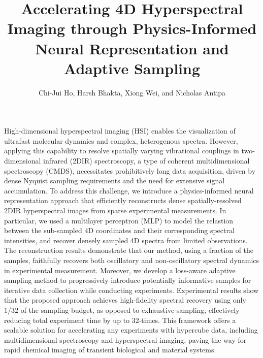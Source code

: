 \documentclass{optica-article}
\begin{document}
\title{Accelerating 4D Hyperspectral Imaging through Physics-Informed Neural Representation and Adaptive Sampling}

\author{
Chi-Jui Ho,
Harsh Bhakta,
Xiong Wei,
and Nicholas Antipa
}

\address{
Dept. of Electrical and Computer Engineering, UC San Diego, La Jolla, CA 92093, USA\\
Dept. of Chemistry and Biochemistry, UC San Diego, La Jolla, CA 92093, USA
}



\begin{abstract*} 
High-dimensional hyperspectral imaging (HSI) enables the visualization of ultrafast molecular dynamics and complex, heterogenous spectra. However, applying this capability to resolve spatially varying vibrational couplings in two-dimensional infrared (2DIR) spectroscopy, a type of coherent multidimensional spectroscopy (CMDS), necessitates prohibitively long data acquisition, driven by dense Nyquist sampling requirements and the need for extensive signal accumulation. To address this challenge, we introduce a physics-informed neural representation approach that efficiently reconstructs dense spatially-resolved 2DIR hyperspectral images from sparse experimental measurements. In particular, we used a multilayer perceptron (MLP) to model the relastion between the sub-sampled 4D coordinates and their corresponding spectral intensities, and recover densely sampled 4D spectra from limited observations. The reconstruction results demonstrate that our method, using a fraction of the samples, faithfully recovers both oscillatory and non-oscillatory spectral dynamics in experimental measurement. Moreover, we develop a loss-aware adaptive sampling method to progressively introduce potentially informative samples for iterative data collection while conducting experiments. Experimental results show that the proposed approach achieves high-fidelity spectral recovery using only $1/32$ of the sampling budget, as opposed to exhaustive sampling, effectively reducing total experiment time by up to 32-times. This framework offers a scalable solution for accelerating any experiments with hypercube data, including multidimensional spectroscopy and hyperspectral imaging, paving the way for rapid chemical imaging of transient biological and material systems.

\end{abstract*}
\end{document}
